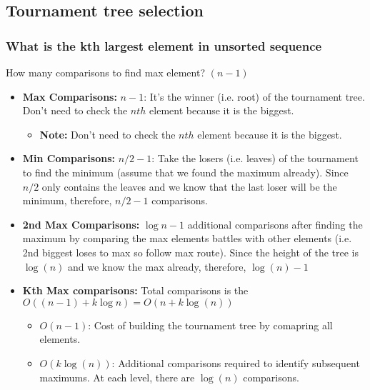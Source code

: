 \subsection{Tournament tree selection}
    \subsubsection{What is the kth largest element in unsorted sequence}
    \begin{definition}
        How many comparisons to find max element? $(n-1)$ 
        \begin{itemize}
            \item \textbf{Max Comparisons:} $n-1$: It's the winner (i.e. root) of the tournament tree. Don't need to check the $nth$ element because it is the biggest.
            \begin{itemize}
                \item \textbf{Note:} Don't need to check the $nth$ element because it is the biggest.
            \end{itemize}
            \item \textbf{Min Comparisons:} $n/2 - 1$: Take the losers (i.e. leaves) of the tournament to find the minimum (assume that we found the maximum already). Since $n/2$ only contains the leaves and we know that the last loser will be the minimum, therefore, $n/2 - 1$ comparisons.
            \item \textbf{2nd Max Comparisons:} $\log n - 1$ additional comparisons after finding the maximum by comparing the max elements battles with other elements (i.e. 2nd biggest loses to max so follow max route). Since the height of the tree is $\log(n)$ and we know the max already, therefore, $\log(n) - 1$
            \item \textbf{Kth Max comparisons:} Total comparisons is the $O((n-1) + k\log n)=O(n+k\log(n))$
            \begin{itemize}
                \item $O(n-1)$: Cost of building the tournament tree by comapring all elements. 
                \item $O(k\log(n))$: Additional comparisons required to identify subsequent maximums. At each level, there are $\log(n)$ comparisons.
            \end{itemize}
        \end{itemize}
    \end{definition}

